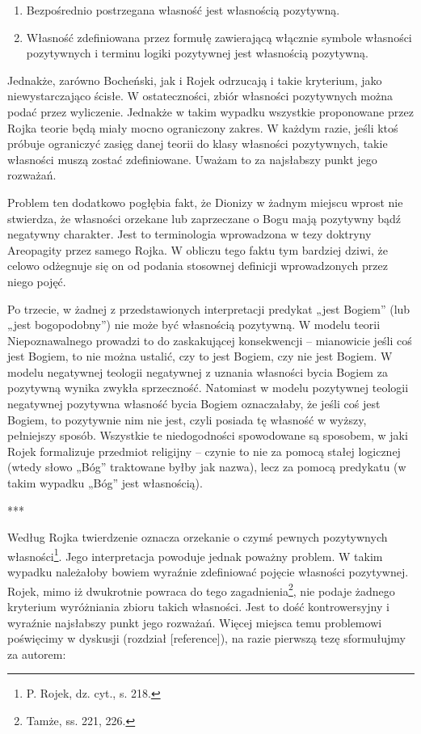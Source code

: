\begin{enumerate}
\item Bezpośrednio postrzegana własność jest własnością pozytywną.
\item Własność zdefiniowana przez formułę zawierającą włącznie symbole
własności pozytywnych i terminu logiki pozytywnej jest własnością
pozytywną.
\end{enumerate}
Jednakże, zarówno Bocheński, jak i Rojek odrzucają i takie kryterium,
jako niewystarczająco ścisłe. W ostateczności, zbiór własności
pozytywnych można podać przez wyliczenie. Jednakże w takim wypadku
wszystkie proponowane przez Rojka teorie będą miały mocno ograniczony
zakres. W każdym razie, jeśli ktoś próbuje ograniczyć zasięg danej
teorii do klasy własności pozytywnych, takie własności muszą zostać
zdefiniowane. Uważam to za najsłabszy punkt jego rozważań.

Problem ten dodatkowo pogłębia fakt, że Dionizy w żadnym miejscu wprost
nie stwierdza, że własności orzekane lub zaprzeczane o Bogu mają
pozytywny bądź negatywny charakter. Jest to terminologia wprowadzona w
tezy doktryny Areopagity przez samego Rojka. W obliczu tego faktu tym
bardziej dziwi, że celowo odżegnuje się on od podania stosownej
definicji wprowadzonych przez niego pojęć.

Po trzecie, w żadnej z przedstawionych interpretacji predykat „jest
Bogiem” (lub „jest bogopodobny”) nie może być własnością pozytywną. W
modelu teorii Niepoznawalnego prowadzi to do zaskakującej konsekwencji
– mianowicie jeśli coś jest Bogiem, to nie można ustalić, czy to jest
Bogiem, czy nie jest Bogiem. W modelu negatywnej teologii negatywnej z
uznania własności bycia Bogiem za pozytywną wynika zwykła sprzeczność.
Natomiast w modelu pozytywnej teologii negatywnej pozytywna własność
bycia Bogiem oznaczałaby, że jeśli coś jest Bogiem, to pozytywnie nim
nie jest, czyli posiada tę własność w wyższy, pełniejszy sposób.
Wszystkie te niedogodności spowodowane są sposobem, w jaki Rojek
formalizuje przedmiot religijny -- czynie to nie za pomocą stałej
logicznej (wtedy słowo „Bóg” traktowane byłby jak nazwa), lecz za
pomocą predykatu (w takim wypadku „Bóg” jest własnością).


***

Według Rojka twierdzenie oznacza orzekanie o czymś pewnych pozytywnych
własności\footnote{P. Rojek, dz. cyt., s. 218. }. Jego
interpretacja powoduje jednak poważny problem. W takim wypadku
należałoby bowiem wyraźnie zdefiniować pojęcie własności pozytywnej.
Rojek, mimo iż dwukrotnie powraca do tego zagadnienia\footnote{Tamże,
ss. 221, 226. }, nie podaje żadnego kryterium wyróżniania zbioru
takich własności. Jest to dość kontrowersyjny i wyraźnie najsłabszy
punkt jego rozważań. Więcej miejsca temu problemowi poświęcimy w
dyskusji (rozdział [reference]), na razie pierwszą tezę sformułujmy za
autorem:

